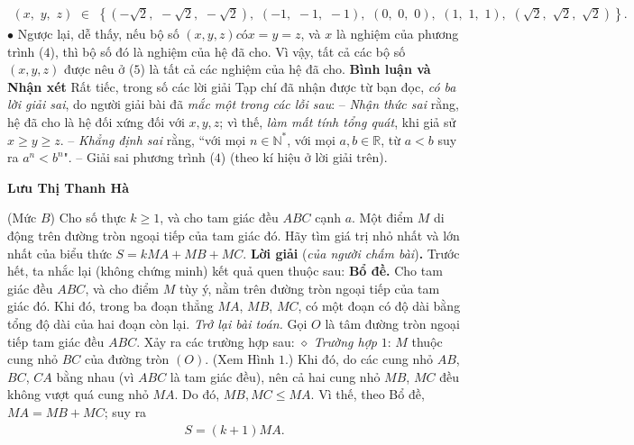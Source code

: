 \begin{multicols}{2}
	\begin{align*}
		\left( {x,\,\,y,\,\,z} \right)\,\, \in \,\,\left\{ {\left( { - \sqrt 2 ,\,\, - \sqrt 2 ,\,\, - \sqrt 2 } \right),\,\,\left( { - 1,\,\, - 1,\,\, - 1} \right),\,\,\left( {0,\,\,0,\,\,0} \right),\,\,\left( {1,\,\,1,\,\,1} \right),\,\,\left( {\sqrt 2 ,\,\,\sqrt 2 ,\,\,\sqrt 2 } \right)} \right\}.
	\end{align*}
	$\bullet$ Ngược lại, dễ thấy, nếu bộ số $(x, y, z) có x = y = z$, và $x$ là nghiệm của phương trình ($4$), thì bộ số đó là nghiệm của hệ đã cho.
	\vskip 0.05cm
	Vì vậy, tất cả các bộ số $(x, y, z)$ được nêu ở ($5$) là tất cả các nghiệm của hệ đã cho.
	\vskip 0.05cm
	\textbf{Bình luận và Nhận xét}
	\vskip 0.05cm
	Rất tiếc, trong số các lời giải Tạp chí đã nhận được từ bạn đọc, \textit{có ba lời giải sai}, do người giải bài đã \textit{mắc một trong các lỗi sau}:
	\vskip 0.05cm
	-- \textit{Nhận thức sai} rằng, hệ đã cho là hệ đối xứng đối với $x, y, z$; vì thế, \textit{làm mất tính tổng quát}, khi giả sử $x \ge y \ge z$.
	\vskip 0.05cm
	-- \textit{Khẳng định sai} rằng, ``với mọi $n \in \mathbb{N^*}$, với mọi $a,b \in \mathbb{R}$, từ $a < b$ suy ra $a^n < b^n$".
	\vskip 0.05cm
	-- Giải sai phương trình ($4$) (theo kí hiệu ở lời giải trên).
	\begin{flushright}
		\textbf{Lưu Thị Thanh Hà}
	\end{flushright}
	{}
	(Mức $B$) Cho số thực $k\ge1$, và cho tam giác đều $ABC$ cạnh $a$. Một điểm $M$ di động trên đường tròn ngoại tiếp của tam giác đó. Hãy tìm giá trị nhỏ nhất và lớn nhất của biểu thức $S=kMA+MB+MC$.
	\vskip 0.05cm
	\textbf{Lời giải} (\textit{của người chấm bài})\textbf{.}
	\vskip 0.05cm
	Trước hết, ta nhắc lại (không chứng minh) kết quả quen thuộc sau:
	\vskip 0.05cm
	\textbf{Bổ đề.} Cho tam giác đều $ABC$, và cho điểm $M$ tùy ý, nằm trên đường tròn ngoại tiếp của tam giác đó. Khi đó, trong ba đoạn thẳng $MA$, $MB$, $MC$, có một đoạn có độ dài bằng tổng độ dài của hai đoạn còn lại.
	\vskip 0.05cm
	\textit{Trở lại bài toán.}
	\vskip 0.05cm
	Gọi $O$ là tâm đường tròn ngoại tiếp tam giác đều $ABC$. Xảy ra các trường hợp sau:
	\vskip 0.05cm
	$\diamond$ \textit{Trường hợp} $1$: $M$ thuộc cung nhỏ $BC$ của đường tròn $(O)$. (Xem Hình $1$.)
	\vskip 0.05cm
	Khi đó, do các cung nhỏ $AB$, $BC$, $CA$ bằng nhau (vì $ABC$ là tam giác đều), nên cả hai cung nhỏ $MB$, $MC$ đều không vượt quá cung nhỏ $MA$. Do đó, $MB, MC \le MA$. Vì thế, theo Bổ đề, $MA = MB + MC$; suy ra
	\begin{align*}
		S = (k + 1)MA.                            \tag{$1$} 

\end{align*}
\end{multicols}
